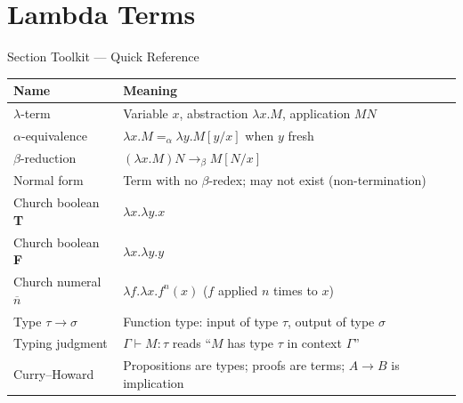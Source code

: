 \section{Lambda Terms}

\begin{toolkitbox}{Section Toolkit --- Quick Reference}
\small
\begin{tabular}{l l}
\toprule
\textbf{Name} & \textbf{Meaning} \\
\midrule
$\lambda$-term
  & Variable $x$, abstraction $\lambda x.M$, application $MN$ \\
$\alpha$-equivalence
  & $\lambda x.M =_\alpha \lambda y.M[y/x]$ when $y$ fresh \\
$\beta$-reduction
  & $(\lambda x.M)N \to_\beta M[N/x]$ \\
Normal form
  & Term with no $\beta$-redex; may not exist (non-termination) \\
Church boolean \textbf{T}
  & $\lambda x.\lambda y.x$ \\
Church boolean \textbf{F}
  & $\lambda x.\lambda y.y$ \\
Church numeral $\overline{n}$
  & $\lambda f.\lambda x.f^n(x)$ ($f$ applied $n$ times to $x$) \\
Type $\tau \to \sigma$
  & Function type: input of type $\tau$, output of type $\sigma$ \\
Typing judgment
  & $\Gamma\vdash M : \tau$ reads ``$M$ has type $\tau$ in context $\Gamma$'' \\
Curry--Howard
  & Propositions are types; proofs are terms; $A\to B$ is implication \\
\bottomrule
\end{tabular}
\end{toolkitbox}


